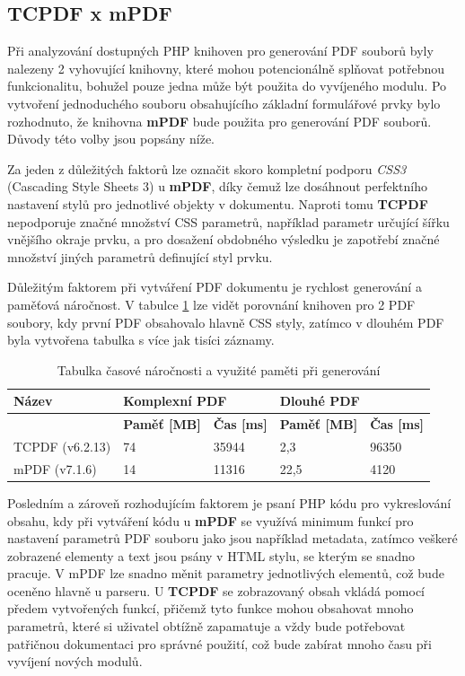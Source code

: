 \subsection{TCPDF x mPDF}
Při analyzování dostupných PHP knihoven pro generování PDF souborů byly nalezeny 2 vyhovující knihovny, které mohou potencionálně splňovat potřebnou funkcionalitu, bohužel pouze jedna může být použita do vyvíjeného modulu. Po vytvoření jednoduchého souboru obsahujícího základní formulářové prvky bylo rozhodnuto, že knihovna \textbf{mPDF} bude použita pro generování PDF souborů. Důvody této volby jsou popsány níže.
\par
Za jeden z důležitých faktorů lze označit skoro kompletní podporu \textit{CSS3} (Cascading Style Sheets 3) u \textbf{mPDF}, díky čemuž lze dosáhnout perfektního nastavení stylů pro jednotlivé objekty v dokumentu. Naproti tomu \textbf{TCPDF} nepodporuje značné množství CSS parametrů, například parametr určující šířku vnějšího okraje prvku, a pro dosažení obdobného výsledku je zapotřebí značné množství jiných parametrů definující styl prvku.
\par
Důležitým faktorem při vytváření PDF dokumentu je rychlost generování a paměťová náročnost. V tabulce \ref{tab:table_generators} lze vidět porovnání knihoven pro 2  PDF soubory, kdy první PDF obsahovalo hlavně CSS styly, zatímco v dlouhém PDF byla vytvořena tabulka s více jak tisíci záznamy.
\begin{table}[h!]
\centering
\begin{tabular}{|l|l|l|l|l|} 
\hline
\textbf{Název} & \multicolumn{2}{l|}{\textbf{Komplexní PDF}} & \multicolumn{2}{l|}{\textbf{Dlouhé PDF}}  \\ 
\hline
               & \textbf{Paměť [MB]} & \textbf{Čas [ms]}     & \textbf{Paměť [MB]} & \textbf{Čas [ms]}   \\ 
\hline
TCPDF (v6.2.13)          & 74                  & 35944                 & 2,3                 & 96350               \\ 
\hline
mPDF   (v7.1.6)           & 14                  & 11316                 & 22,5                & 4120                \\
\hline
\end{tabular}
\caption{Tabulka časové náročnosti a využité paměti při generování}
\label{tab:table_generators}
\end{table}
\par
Posledním a zároveň rozhodujícím faktorem je psaní PHP kódu pro vykreslování obsahu, kdy při vytváření kódu u \textbf{mPDF} se využívá minimum funkcí pro nastavení parametrů PDF souboru jako jsou například metadata, zatímco veškeré zobrazené elementy a text jsou psány v HTML stylu, se kterým se snadno pracuje. V mPDF lze snadno měnit parametry jednotlivých elementů, což bude oceněno hlavně u parseru. U \textbf{TCPDF} se zobrazovaný obsah vkládá pomocí předem vytvořených funkcí, přičemž tyto funkce mohou obsahovat mnoho parametrů, které si uživatel obtížně zapamatuje a vždy bude potřebovat patřičnou dokumentaci pro správné použití, což bude zabírat mnoho času při vyvíjení nových modulů.
